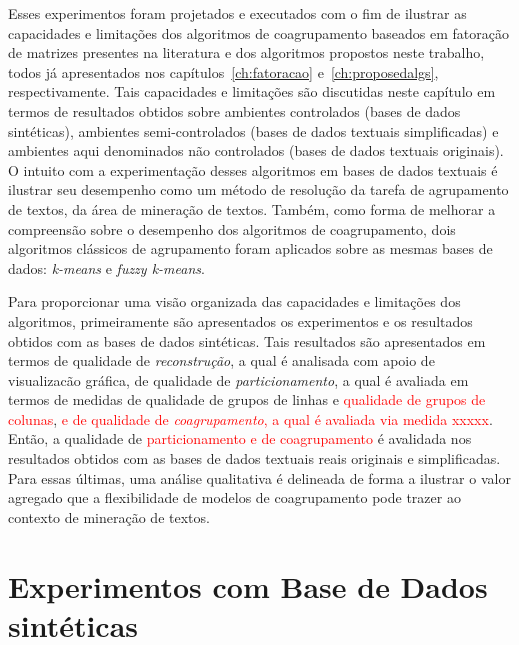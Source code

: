 \documentclass[
    12pt,                %
    oneside,            %
    a4paper,            %
    english,            %
    brazil                %
    ]{abntex2ppgsi}
\begin{document}
Esses experimentos foram projetados e executados com o fim de ilustrar as capacidades e limitações dos algoritmos de coagrupamento baseados em fatoração de matrizes presentes na literatura e dos algoritmos propostos neste trabalho, todos já apresentados nos capítulos~\ref{ch:fatoracao} e~\ref{ch:proposedalgs}, respectivamente. Tais capacidades e limitações são discutidas neste capítulo em termos de resultados obtidos sobre ambientes controlados (bases de dados sintéticas), ambientes semi-controlados (bases de dados textuais simplificadas) e ambientes aqui denominados não controlados (bases de dados textuais originais). O intuito com a experimentação desses algoritmos em bases de dados textuais é ilustrar seu desempenho como um método de resolução da tarefa de agrupamento de textos, da área de mineração de textos. Também, como forma de melhorar a compreensão sobre o desempenho dos algoritmos de coagrupamento, dois algoritmos clássicos de agrupamento foram aplicados sobre as mesmas bases de dados: \textit{k-means} e \textit{fuzzy k-means}. 


Para proporcionar uma visão organizada das capacidades e limitações dos algoritmos, primeiramente são apresentados os experimentos e os resultados obtidos com as bases de dados sintéticas. Tais resultados são apresentados em termos de qualidade de \textit{reconstrução}, a qual é analisada com apoio de visualizacão gráfica, de qualidade de \textit{particionamento}, a qual é avaliada em termos de medidas de qualidade de grupos de linhas e \textcolor{red}{qualidade de grupos de colunas}, \textcolor{red}{e de qualidade de \textit{coagrupamento}, a qual é avaliada via medida xxxxx}. Então, a qualidade de \textcolor{red}{particionamento e de coagrupamento} é avalidada nos resultados obtidos com as bases de dados textuais reais originais e simplificadas. Para essas últimas, uma análise qualitativa é delineada de forma a ilustrar o valor agregado que a flexibilidade de modelos de coagrupamento pode trazer ao contexto de mineração de textos.


\section{Experimentos com Base de Dados sintéticas}
\end{document}
